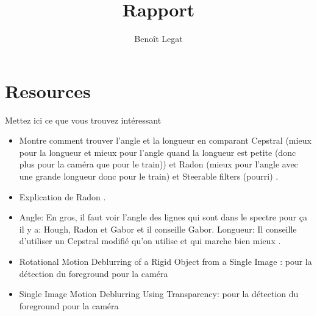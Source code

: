 \documentclass{article}
\title{Rapport}
\author{Benoît Legat}
\begin{document}


\section{Resources}
Mettez ici ce que vous trouvez intéressant
\begin{itemize}
  \item Montre comment trouver l'angle et la longueur en comparant Cepstral (mieux pour la longueur et mieux pour l'angle quand la longueur est petite (donc plus pour la caméra que pour le train)) et Radon (mieux pour l'angle avec une grande longueur donc pour le train) et Steerable filters (pourri) \cite{krahmer2006blind}.
  \item Explication de Radon \cite{oliveira2007blind}.
  \item Angle: En gros, il faut voir l'angle des lignes qui sont dans le spectre pour ça il y a: Hough, Radon et Gabor et il conseille Gabor.
    Longueur: Il conseille d'utiliser un Cepstral modifié qu'on utilise et qui marche bien mieux \cite{Deshpande2014606}.
   \item  Rotational Motion Deblurring of a Rigid Object from a Single Image : pour la détection du foreground pour la caméra
   \item  Single Image Motion Deblurring Using Transparency: pour la détection du foreground pour la caméra
\end{itemize}
\end{document}
